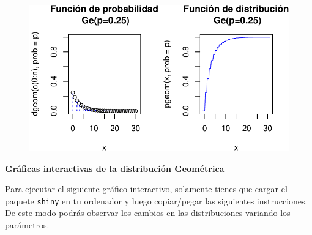 \documentclass[
  letterpaper,
  DIV=11,
  numbers=noendperiod]{scrreprt}
\begin{document}
\begin{figure}

{\centering \includegraphics{3_files/figure-pdf/graficos22-1.pdf}

}

\end{figure}

\textbf{Gráficas interactivas de la distribución Geométrica}

Para ejecutar el siguiente gráfico interactivo, solamente tienes que
cargar el paquete \texttt{shiny} en tu ordenador y luego copiar/pegar
las siguientes instrucciones. De este modo podrás observar los cambios
en las distribuciones variando los parámetros.
\end{document}

